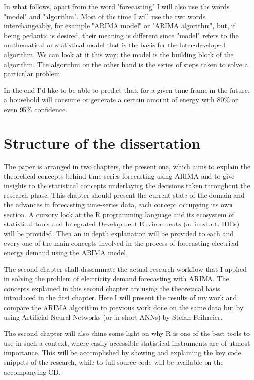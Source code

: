 \documentclass[12pt,a4paper,titlepage]{report}
\begin{document}
In what follows, apart from the word "forecasting" I will also use the words "model" and "algorithm". Most of the time I will use the two words interchangeably, for example "ARIMA model" or "ARIMA algorithm", but, if being pedantic is desired, their meaning is different since "model" refers to the mathematical or statistical model that is the basis for the later-developed algorithm. We can look at it this way: the model is the building block of the algorithm. The algorithm on the other hand is the series of steps taken to solve a particular problem.

In the end I'd like to be able to predict that, for a given time frame in the future, a household will consume or generate a certain amount of energy with 80\% or even 95\% confidence.

\section{Structure of the dissertation}

The paper is arranged in two chapters, the present one, which aims to explain the theoretical concepts behind time-series forecasting using ARIMA and to give insights to the statistical concepts underlaying the decisions taken throughout the research phase.
This chapter should present the current state of the domain and the advances in forecasting time-series data, each concept occupying its own section. A cursory look at the R programming language and its ecosystem of statistical tools and Integrated Development Environments (or in short: IDEs) will be provided. Then an in depth explanation will be provided to each and every one of the main concepts involved in the process of forecasting electrical energy demand using the ARIMA model.

The second chapter shall disseminate the actual research workflow that I applied in solving the problem of electricity demand forecasting with ARIMA. The concepts explained in this second chapter are using the theoretical basis introduced in the first chapter.
Here I will present the results of my work and compare the ARIMA algorithm to previous work done on the same data but by using Artificial Neural Networks (or in short ANNs) by Stefan Feilmeier.

The second chapter will also shine some light on why R is one of the best tools to use in such a context, where easily accessible statistical instruments are of utmost importance. This will be accomplished by showing and explaining the key code snippets of the research, while to full source code will be available on the accompanying CD.
\end{document}
